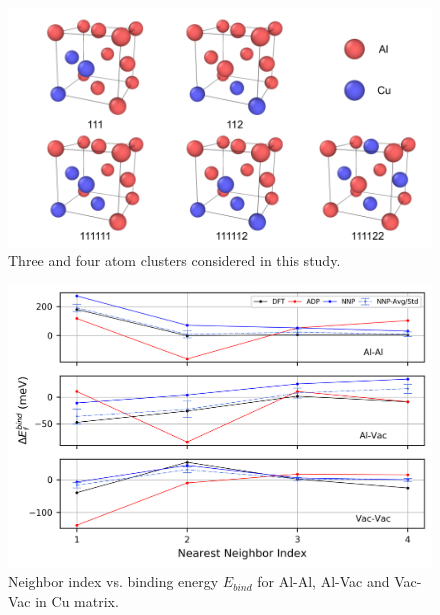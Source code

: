 \documentclass{article}
\begin{document}
\begin{figure}[H]%
\centering%
\includegraphics[width=1\textwidth,center]{figures/ClusterPlot-Daniel-2020.04.15.png}%
\caption{Three and four atom clusters considered in this study.}%
\label{fig:atomview_clusters}
\end{figure}

\begin{figure}[H]%
\centering%
\includegraphics[width=1\textwidth,center]{./figures/solsol_in_cu.png}%
\caption{Neighbor index vs. binding energy $E_{bind}$ for Al-Al, Al-Vac and Vac-Vac in Cu matrix.}%
\label{fig:solsol_in_cu}
\end{figure}
\end{document}
